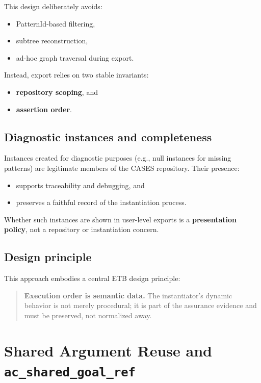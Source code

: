 \documentclass[12pt,twoside,a4paper]{article}
\begin{document}
This design deliberately avoids:

\begin{itemize}
  \item PatternId-based filtering,
  \item subtree reconstruction,
  \item ad-hoc graph traversal during export.
\end{itemize}

Instead, export relies on two stable invariants:

\begin{itemize}
  \item \textbf{repository scoping}, and
  \item \textbf{assertion order}.
\end{itemize}

\subsection{Diagnostic instances and completeness}
\label{subsec:diagnostic-instances}

Instances created for diagnostic purposes (e.g., null instances for missing patterns) are legitimate members of the CASES repository. Their presence:

\begin{itemize}
  \item supports traceability and debugging, and
  \item preserves a faithful record of the instantiation process.
\end{itemize}

Whether such instances are shown in user-level exports is a \textbf{presentation policy}, not a repository or instantiation concern.

\subsection{Design principle}
\label{subsec:design-principle-instantiation}

This approach embodies a central ETB design principle:

\begin{quote}
\textbf{Execution order is semantic data.}  
The instantiator’s dynamic behavior is not merely procedural; it is part of the assurance evidence and must be preserved, not normalized away.
\end{quote}

\section{Shared Argument Reuse and \texttt{ac\_shared\_goal\_ref}}
\end{document}
